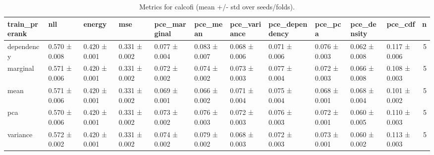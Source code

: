 \begin{table}
\caption{Metrics for calcofi (mean +/- std over seeds/folds).}
\label{tab:metrics_summary_calcofi}
\begin{tabular}{lllllllllllr}
\toprule
train_prerank & nll & energy & mse & pce_marginal & pce_mean & pce_variance & pce_dependency & pce_pca & pce_density & pce_cdf & n \\
\midrule
dependency & 0.570 ± 0.008 & 0.420 ± 0.001 & 0.331 ± 0.002 & 0.077 ± 0.004 & 0.083 ± 0.007 & 0.068 ± 0.006 & 0.071 ± 0.006 & 0.076 ± 0.003 & 0.062 ± 0.008 & 0.117 ± 0.006 & 5 \\
marginal & 0.571 ± 0.006 & 0.420 ± 0.001 & 0.331 ± 0.002 & 0.072 ± 0.002 & 0.074 ± 0.002 & 0.073 ± 0.003 & 0.077 ± 0.004 & 0.072 ± 0.003 & 0.066 ± 0.008 & 0.108 ± 0.003 & 5 \\
mean & 0.571 ± 0.006 & 0.420 ± 0.001 & 0.331 ± 0.002 & 0.069 ± 0.001 & 0.066 ± 0.002 & 0.071 ± 0.004 & 0.075 ± 0.004 & 0.068 ± 0.001 & 0.068 ± 0.004 & 0.101 ± 0.002 & 5 \\
pca & 0.570 ± 0.006 & 0.420 ± 0.001 & 0.331 ± 0.002 & 0.073 ± 0.002 & 0.076 ± 0.003 & 0.072 ± 0.003 & 0.076 ± 0.003 & 0.072 ± 0.001 & 0.060 ± 0.005 & 0.110 ± 0.003 & 5 \\
variance & 0.572 ± 0.002 & 0.420 ± 0.001 & 0.331 ± 0.002 & 0.074 ± 0.002 & 0.079 ± 0.002 & 0.068 ± 0.003 & 0.072 ± 0.003 & 0.073 ± 0.001 & 0.060 ± 0.002 & 0.113 ± 0.003 & 5 \\
\bottomrule
\end{tabular}
\end{table}
